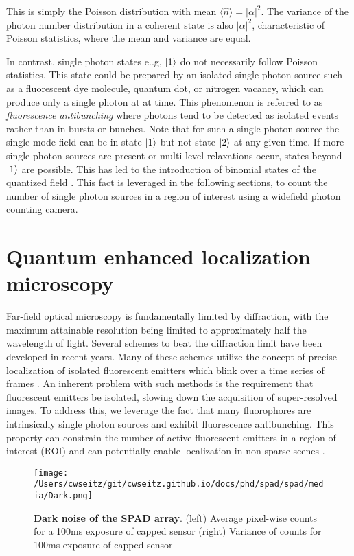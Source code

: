 This is simply the Poisson distribution with mean $\langle \hat{n} \rangle = \lvert\alpha\lvert^2$. The variance of the photon number distribution in a coherent state is also $\lvert\alpha\lvert^2$, characteristic of Poisson statistics, where the mean and variance are equal. 

In contrast, single photon states e..g, $\ket{1}$ do not necessarily follow Poisson statistics. This state could be prepared by an isolated single photon source such as a fluorescent dye molecule, quantum dot, or nitrogen vacancy, which can produce only a single photon at at time. This phenomenon is referred to as \emph{fluorescence antibunching} where photons tend to be detected as isolated events rather than in bursts or bunches. Note that for such a single photon source the single-mode field can be in state $\ket{1}$ but not state $\ket{2}$ at any given time. If more single photon sources are present or multi-level relaxations occur, states beyond $\ket{1}$ are possible. This has led to the introduction of binomial states of the quantized field \parencite{Stoler1985}. This fact is leveraged in the following sections, to count the number of single photon sources in a region of interest using a widefield photon counting camera.

\section{Quantum enhanced localization microscopy}

Far-field optical microscopy is fundamentally limited by diffraction, with the maximum attainable resolution being limited to approximately half the wavelength of light. Several schemes to beat the diffraction limit have been developed in recent years. Many of these schemes utilize the concept of precise localization of isolated fluorescent emitters which blink over a time series of frames \parencite{Rust2006,Betzig2006}. An inherent problem with such methods is the requirement that fluorescent emitters be isolated, slowing down the acquisition of super-resolved images. To address this, we leverage the fact that many fluorophores are intrinsically single photon sources and exhibit fluorescence antibunching. This property can constrain the number of active fluorescent emitters in a region of interest (ROI) and can potentially enable localization in non-sparse scenes \parencite{Ta2010,Israel2017}. 

\begin{figure*}[t]
\centering
\texttt{[image: /Users/cwseitz/git/cwseitz.github.io/docs/phd/spad/spad/media/Dark.png]}
\caption{\textbf{Dark noise of the SPAD array}. (left) Average pixel-wise counts for a 100ms exposure of capped sensor (right) Variance of counts for 100ms exposure of capped sensor}
\label{fig:fig30}
\end{figure*}    


